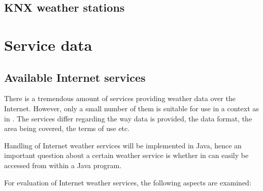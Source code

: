 \subsection{KNX weather stations}

\section{Service data}
\label{sec:weather_services}


\subsection{Available Internet services}
\label{sec:internet_services}

There is a tremendous amount of services providing weather data over the Internet. However, only a small number of them is suitable for use in a context as in \thinkhome. The services differ regarding the way data is provided, the data format, the area being covered, the terms of use etc.

Handling of Internet weather services will be implemented in Java, hence an important question about a certain weather service is whether in can easily be accessed from within a Java program.

For evaluation of Internet weather services, the following aspects are examined:

